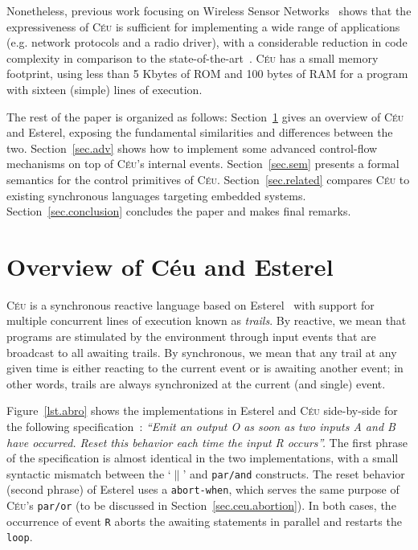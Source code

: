 \documentclass{acm_proc_article-sp}
\newcommand{\CEU}{\textsc{C\'{e}u}\xspace}
\newcommand{\code}[1] {{\small{\texttt{#1}}}}
\newcommand{\1}{\;}
\newcommand{\2}{\;\;}
\newcommand{\3}{\;\;\;}
\newcommand{\5}{\;\;\;\;\;}
\begin{document}
Nonetheless, previous work focusing on Wireless Sensor 
Networks~\cite{ceu.sensys} shows that the expressiveness of \CEU is sufficient 
for implementing a wide range of applications (e.g. network protocols and a 
radio driver), with a considerable reduction in code complexity in comparison 
to the state-of-the-art~\cite{wsn.nesc}.
%
\CEU has a small memory footprint, using less than 5 Kbytes of ROM and 100 
bytes of RAM for a program with sixteen (simple) lines of execution.

The rest of the paper is organized as follows:
Section~\ref{sec.ceu} gives an overview of \CEU and Esterel, exposing the 
fundamental similarities and differences between the two.
Section~\ref{sec.adv} shows how to implement some advanced control-flow 
mechanisms on top of \CEU's internal events.
Section~\ref{sec.sem} presents a formal semantics for the control primitives of 
\CEU.
Section~\ref{sec.related} compares \CEU to existing synchronous languages 
targeting embedded systems.
Section~\ref{sec.conclusion} concludes the paper and makes final remarks.

\newpage
\section{Overview of C\'eu and Esterel}
\label{sec.ceu}

\CEU is a synchronous reactive language based on Esterel~\cite{esterel.ieee91} 
with support for multiple concurrent lines of execution known as \emph{trails}.
By reactive, we mean that programs are stimulated by the environment through 
input events that are broadcast to all awaiting trails.
By synchronous, we mean that any trail at any given time is either reacting to 
the current event or is awaiting another event;
in other words, trails are always synchronized at the current (and single) 
event.

Figure~\ref{lst.abro} shows the implementations in Esterel and \CEU 
side-by-side for the following specification~\cite{esterel.primer}:
%
\emph{``Emit an output O as soon as two inputs A and B have occurred.
Reset this behavior each time the input R occurs''.}
%
The first phrase of the specification is almost identical in the two 
implementations, with a small syntactic mismatch between the `$\|$' and 
\code{par/and} constructs.
%
The reset behavior (second phrase) of Esterel uses a \code{abort-when}, which 
serves the same purpose of \CEU's \code{par/or} (to be discussed in 
Section~\ref{sec.ceu.abortion}).
In both cases, the occurrence of event \code{R} aborts the awaiting statements 
in parallel and restarts the \code{loop}.
\end{document}
